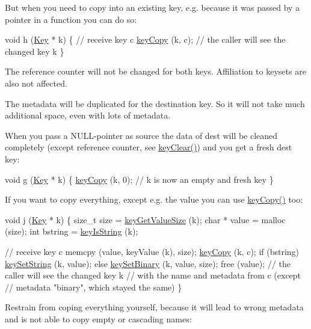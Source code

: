 But when you need to copy into an existing key, e.\+g. because it was passed by a pointer in a function you can do so\+:


\begin{DoxyCodeInclude}
\textcolor{keywordtype}{void} h (\hyperlink{classkdb_1_1Key_a5679f5cae63caddd64a60388b9cc77fa}{Key} * k)
\{
        \textcolor{comment}{// receive key c}
        \hyperlink{group__key_ga6a12cbbe656a1ad9f41b8c681d7a2f92}{keyCopy} (k, c);
        \textcolor{comment}{// the caller will see the changed key k}
\}
\end{DoxyCodeInclude}
 The reference counter will not be changed for both keys. Affiliation to keysets are also not affected.

The metadata will be duplicated for the destination key. So it will not take much additional space, even with lots of metadata.

When you pass a N\+U\+L\+L-\/pointer as source the data of dest will be cleaned completely (except reference counter, see \hyperlink{group__key_gab2242311a36bbc0520e0d36895107ec1}{key\+Clear()}) and you get a fresh dest key\+:


\begin{DoxyCodeInclude}
\textcolor{keywordtype}{void} g (\hyperlink{classkdb_1_1Key_a5679f5cae63caddd64a60388b9cc77fa}{Key} * k)
\{
        \hyperlink{group__key_ga6a12cbbe656a1ad9f41b8c681d7a2f92}{keyCopy} (k, 0);
        \textcolor{comment}{// k is now an empty and fresh key}
\}
\end{DoxyCodeInclude}
 If you want to copy everything, except e.\+g. the value you can use \hyperlink{group__key_ga6a12cbbe656a1ad9f41b8c681d7a2f92}{key\+Copy()} too\+:


\begin{DoxyCodeInclude}
\textcolor{keywordtype}{void} j (\hyperlink{classkdb_1_1Key_a5679f5cae63caddd64a60388b9cc77fa}{Key} * k)
\{
        \textcolor{keywordtype}{size\_t} size = \hyperlink{group__keyvalue_gae326672fffb7474abfe9baf53b73217e}{keyGetValueSize} (k);
        \textcolor{keywordtype}{char} * value = malloc (size);
        \textcolor{keywordtype}{int} bstring = \hyperlink{group__keytest_gaea7670778abd07fee0fe8ac12a149190}{keyIsString} (k);

        \textcolor{comment}{// receive key c}
        memcpy (value, keyValue (k), size);
        \hyperlink{group__key_ga6a12cbbe656a1ad9f41b8c681d7a2f92}{keyCopy} (k, c);
        \textcolor{keywordflow}{if} (bstring)
                \hyperlink{group__keyvalue_ga622bde1eb0e0c4994728331326340ef2}{keySetString} (k, value);
        \textcolor{keywordflow}{else}
                \hyperlink{group__keyvalue_gaa50a5358fd328d373a45f395fa1b99e7}{keySetBinary} (k, value, size);
        free (value);
        \textcolor{comment}{// the caller will see the changed key k}
        \textcolor{comment}{// with the name and metadata from c (except}
        \textcolor{comment}{// metadata "binary", which stayed the same)}
\}
\end{DoxyCodeInclude}
 Restrain from coping everything yourself, because it will lead to wrong metadata and is not able to copy empty or cascading names\+:


